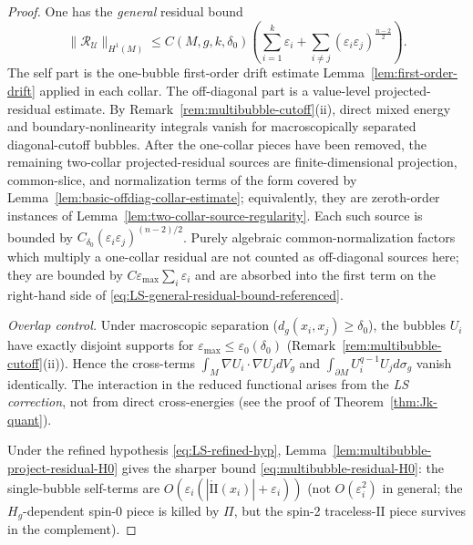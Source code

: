 \documentclass[11pt,reqno,a4paper]{amsart}
\numberwithin{equation}{section}
\theoremstyle{plain}
\theoremstyle{remark}
\theoremstyle{plain}
\begin{document}
\begin{proof}
One has the \emph{general} residual bound
\begin{equation}\label{eq:LS-general-residual-bound-referenced}
\|\mathcal R_{\mathcal U}\|_{H^1(M)}
\le
C(M,g,k,\delta_0)\left(
\sum_{i=1}^k \varepsilon_i
+
\sum_{i\ne j}(\varepsilon_i\varepsilon_j)^{\frac{n-2}{2}}
\right).
\end{equation}
The self part is the one-bubble first-order drift estimate
Lemma~\ref{lem:first-order-drift} applied in each collar.  The off-diagonal part is a
value-level projected-residual estimate.  By
Remark~\ref{rem:multibubble-cutoff}\textup{(ii)}, direct mixed energy and boundary-nonlinearity
integrals vanish for macroscopically separated diagonal-cutoff bubbles.  After the one-collar
pieces have been removed, the remaining two-collar projected-residual sources are
finite-dimensional projection, common-slice, and normalization terms of the form covered by
Lemma~\ref{lem:basic-offdiag-collar-estimate}; equivalently, they are zeroth-order instances of
Lemma~\ref{lem:two-collar-source-regularity}.  Each such source is bounded by
$C_{\delta_0}(\varepsilon_i\varepsilon_j)^{(n-2)/2}$.  Purely algebraic common-normalization factors
which multiply a one-collar residual are not counted as off-diagonal sources here; they are bounded by
$C\varepsilon_{\max}\sum_i\varepsilon_i$ and are absorbed into the first term on the right-hand side of
\eqref{eq:LS-general-residual-bound-referenced}.

\emph{Overlap control.}
Under macroscopic separation ($d_g(x_i,x_j)\ge\delta_0$),
the bubbles $U_i$ have exactly disjoint supports for $\varepsilon_{\max}\le\varepsilon_0(\delta_0)$
(Remark~\ref{rem:multibubble-cutoff}\textup{(ii)}).
Hence the cross-terms $\int_M\nabla U_i\cdot\nabla U_jdV_g$
and $\int_{\partial M}U_i^{q-1}U_jd\sigma_g$ vanish identically.
The interaction in the reduced functional arises from the \emph{LS correction},
not from direct cross-energies (see the proof of Theorem~\ref{thm:Jk-quant}).

Under the refined hypothesis \eqref{eq:LS-refined-hyp}, Lemma~\ref{lem:multibubble-project-residual-H0}
gives the sharper bound \eqref{eq:multibubble-residual-H0}: the single-bubble self-terms are
$O(\varepsilon_i(|\mathring{\mathrm{II}}(x_i)|+\varepsilon_i))$ (not $O(\varepsilon_i^2)$ in general;
the $H_g$-dependent spin-0 piece is killed by $\Pi$, but the spin-2 traceless-$\mathrm{II}$
piece survives in the complement).


\end{proof}
\end{document}
